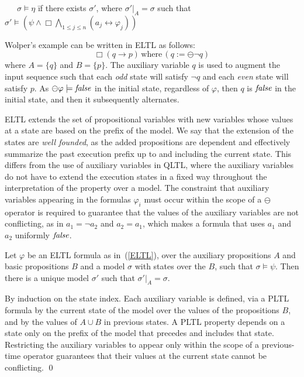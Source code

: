 \begin{tabbing}
\ \ \ $\sigma \models \eta$ \=  if there exists $\sigma'$, where
$\sigma' |_A = \sigma$ such that \\
 \> $\sigma' \models ( \psi  \wedge   \Box \bigwedge_{1 \leq j \leq n} ( a_j \leftrightarrow \varphi_j)) $
\end{tabbing}

\noindent
Wolper's example can be written in ELTL
as follows:
\begin{equation} 
\label{form3}
\Box ( q \rightarrow p ) \, \mathrm{where} \, 
 ( q := \ominus \neg q)
\end{equation}
where $A = \{ q\}$ and $B = \{ p \}$.
The auxiliary variable $q$ is used to augment the input sequence such that each {\em odd} state will satisfy $\neg q$
and each {\em even} state will satisfy $p$.  As $\ominus \varphi \models \mathit{false}$ in the initial state, regardless of $\varphi$, then
$q$ is $\mathit{false}$ in the initial state, and then it subsequently alternates.


ELTL extends the set of propositional variables with new variables whose values at a state are
based on the prefix of the model. We say that
the extension of the states are {\em well founded},
as the added propositions are dependent and effectively summarize the past execution prefix up to and
including the current state.
This differs from 
the use of auxiliary variables in QLTL, where the auxiliary variables do not have to extend the execution
states in a fixed way throughout the interpretation of 
the property over a model. The constraint that auxiliary variables appearing in the formulas $\varphi_i$ 
must occur within the scope of a $\ominus$ operator
is required to guarantee that the values
of the auxiliary variables are not conflicting, as in
$a_1 = \neg a_2$ and $a_2 = a_1$, which makes a formula
that uses $a_1$ and $a_2$ uniformly $\mathit{false}$.

\begin{lemma} \label{fourone}
Let $\varphi$ be an ELTL formula as in~(\ref{ELTL}),
over the auxiliary propositions $A$ and basic propositions $B$ 
and a model $\sigma$ with states over the $B$, such that
$\sigma \models \psi$.
Then there is a unique
model $\sigma'$ such that $\sigma' |_A = \sigma$.

\end{lemma}


 By induction on the state index. Each auxiliary variable
is defined, via a PLTL formula by the current state of the model over the values of the propositions $B$, and by the values of $A \cup B$ in previous states. A PLTL
property depends on a state only on the prefix
of the model that precedes and includes that state.
Restricting the auxiliary variables to appear only within the scope of a previous-time operator guarantees that
their values at the current state cannot be conflicting. \qed


